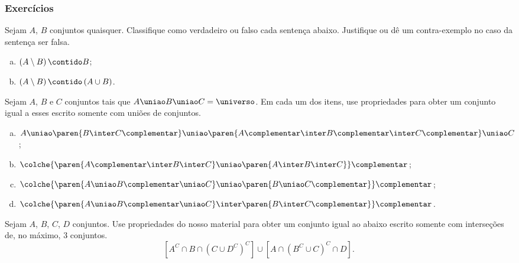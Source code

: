 \begin{frame}
	\frametitle{Exercícios}
	
	\begin{exercicio}
		Sejam $A$, $B$ conjuntos quaisquer. Classifique como verdadeiro ou falso cada sentença abaixo. Justifique ou dê um contra-exemplo no caso da sentença ser falsa.
            \begin{enumerate}[a)]
                \item  $\left(A \setminus B\right) \contido B$;
                \item  $\left(A \setminus B\right) \contido \left(A \cup B\right)$.
            \end{enumerate}
	\end{exercicio}

	\begin{exercicio}
		Sejam $A$, $B$ e $C$ conjuntos tais que $A \uniao B \uniao C = \universo$. Em cada um dos itens, use propriedades para obter um conjunto igual a esses escrito somente com uniões de conjuntos.
		\begin{enumerate}[a)]
			\item $A \uniao \paren{ B \inter C\complementar} \uniao \paren{A\complementar \inter B\complementar \inter C\complementar} \uniao C$;
			\item $\colche{\paren{A\complementar \inter B \inter C} \uniao \paren{A \inter B \inter C}}\complementar$;
			\item $\colche {\paren{A \uniao B\complementar \uniao C} \uniao \paren{B \uniao C\complementar}}\complementar $;
			\item $\colche {\paren{A \uniao B\complementar \uniao C} \inter \paren{B \inter C\complementar}}\complementar $.
		\end{enumerate}
	\end{exercicio}

	\begin{exercicio}
		Sejam $A$, $B$, $C$, $D$ conjuntos. Use propriedades do nosso material para obter um conjunto igual ao abaixo escrito somente com interseções de, no máximo, 3 conjuntos.
        $$[A^C \cap B \cap (C \cup D^C)^C] \cup [A \cap (B^C \cup C)^C \cap D].$$
	\end{exercicio}
\end{frame}


